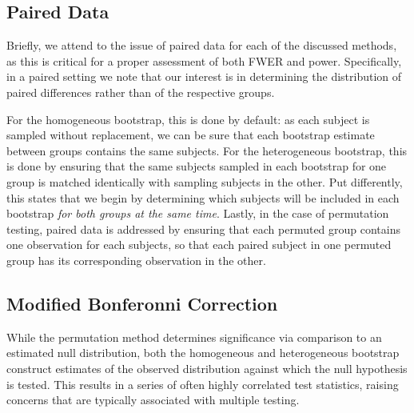 \documentclass{article}
\begin{document}
\subsection{Paired Data}

Briefly, we attend to the issue of paired data for each of the discussed methods, as this is critical for a proper assessment of both FWER and power. Specifically, in a paired setting we note that our interest is in determining the distribution of paired differences rather than of the respective groups. 

For the homogeneous bootstrap, this is done by default: as each subject is sampled without replacement, we can be sure that each bootstrap estimate between groups contains the same subjects. For the heterogeneous bootstrap, this is done by ensuring that the same subjects sampled in each bootstrap for one group is matched identically with sampling subjects in the other. Put differently, this states that we begin by determining which subjects will be included in each bootstrap \textit{for both groups at the same time}. Lastly, in the case of permutation testing, paired data is addressed by ensuring that each permuted group contains one observation for each subjects, so that each paired subject in one permuted group has its corresponding observation in the other. 

\subsection{Modified Bonferonni Correction}

While the permutation method determines significance via comparison to an estimated null distribution, both the homogeneous and heterogeneous bootstrap construct estimates of the observed distribution against which the null hypothesis is tested. This results in a series of often highly correlated test statistics, raising concerns that are typically associated with multiple testing. 
\end{document}
